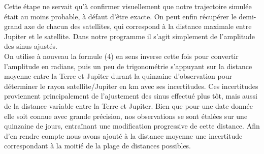 \documentclass{aa}
\begin{document}
Cette étape ne servait qu'à confirmer visuellement que notre trajectoire simulée était au moins probable, à défaut d'être exacte. On peut enfin récupérer le demi-grand axe de chacun des satellites, qui correspond à la distance maximale entre Jupiter et le satellite. Dans notre programme il s'agit simplement de l'amplitude des sinus ajustés.\\
On utilise à nouveau la formule (4) en sens inverse cette fois pour convertir l'amplitude en radians, puis un peu de trigonométrie  s'appuyant sur la distance moyenne entre la Terre et Jupiter durant la quinzaine d'observation pour déterminer le rayon satellite/Jupiter en km avec ses incertitudes. Ces incertitudes proviennent principalement de l'ajustement des sinus effectué plus tôt, mais aussi de la distance variable entre la Terre et Jupiter. Bien que pour une date donnée elle soit connue avec grande précision, nos observations se sont étalées sur une quinzaine de jours, entraînant une modification progressive de cette distance. Afin d'en rendre compte nous avons ajouté à la distance moyenne une incertitude correspondant à la moitié de la plage de distances possibles.\\
\end{document}
